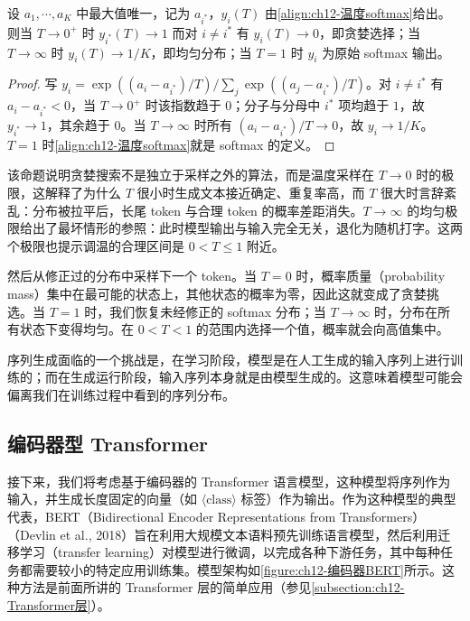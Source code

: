 \documentclass[../../main.tex]{subfiles}
\begin{document}
\begin{proposition}[温度的极限行为]\label{proposition:ch12-温度极限}
设 $a_1,\cdots,a_K$ 中最大值唯一，记为 $a_{i^*}$，$y_i(T)$ 由\eqref{align:ch12-温度softmax}给出。则当 $T\to0^{+}$ 时 $y_{i^*}(T)\to1$ 而对 $i\neq i^*$ 有 $y_i(T)\to0$，即贪婪选择；当 $T\to\infty$ 时 $y_i(T)\to1/K$，即均匀分布；当 $T=1$ 时 $y_i$ 为原始 softmax 输出。
\end{proposition}

\begin{proof}
写 $y_i=\exp\left((a_i-a_{i^*})/T\right)\big/\sum_j\exp\left((a_j-a_{i^*})/T\right)$。对 $i\neq i^*$ 有 $a_i-a_{i^*}<0$，当 $T\to0^{+}$ 时该指数趋于 $0$；分子与分母中 $i^*$ 项均趋于 $1$，故 $y_{i^*}\to1$，其余趋于 $0$。当 $T\to\infty$ 时所有 $(a_i-a_{i^*})/T\to0$，故 $y_i\to1/K$。$T=1$ 时\eqref{align:ch12-温度softmax}就是 softmax 的定义。
\end{proof}

\begin{remark}
该命题说明贪婪搜索不是独立于采样之外的算法，而是温度采样在 $T\to0$ 时的极限，这解释了为什么 $T$ 很小时生成文本接近确定、重复率高，而 $T$ 很大时言辞紊乱：分布被拉平后，长尾 token 与合理 token 的概率差距消失。$T\to\infty$ 的均匀极限给出了最坏情形的参照：此时模型输出与输入完全无关，退化为随机打字。这两个极限也提示调温的合理区间是 $0<T\leqslant1$ 附近。
\end{remark}

然后从修正过的分布中采样下一个 token。当 $T=0$ 时，概率质量（probability mass）集中在最可能的状态上，其他状态的概率为零，因此这就变成了贪婪挑选。当 $T=1$ 时，我们恢复未经修正的 softmax 分布；当 $T\to\infty$ 时，分布在所有状态下变得均匀。在 $0<T<1$ 的范围内选择一个值，概率就会向高值集中。

序列生成面临的一个挑战是，在学习阶段，模型是在人工生成的输入序列上进行训练的；而在生成运行阶段，输入序列本身就是由模型生成的。这意味着模型可能会偏离我们在训练过程中看到的序列分布。

\subsection{编码器型 Transformer}\label{subsection:ch12-编码器型Transformer}

接下来，我们将考虑基于编码器的 Transformer 语言模型，这种模型将序列作为输入，并生成长度固定的向量（如 $\langle\mathrm{class}\rangle$ 标签）作为输出。作为这种模型的典型代表，BERT（Bidirectional Encoder Representations from Transformers）（Devlin et al., 2018）旨在利用大规模文本语料预先训练语言模型，然后利用迁移学习（transfer learning）对模型进行微调，以完成各种下游任务，其中每种任务都需要较小的特定应用训练集。模型架构如\cref{figure:ch12-编码器BERT}所示。这种方法是前面所讲的 Transformer 层的简单应用（参见\cref{subsection:ch12-Transformer层}）。
\end{document}
